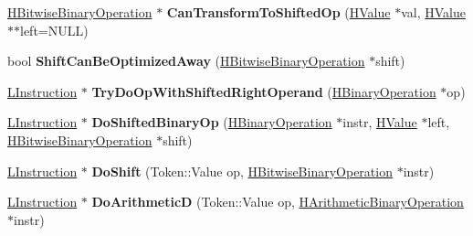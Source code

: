 \begin{DoxyCompactItemize}
\item 
\hyperlink{classv8_1_1internal_1_1_h_bitwise_binary_operation}{H\+Bitwise\+Binary\+Operation} $\ast$ {\bfseries Can\+Transform\+To\+Shifted\+Op} (\hyperlink{classv8_1_1internal_1_1_h_value}{H\+Value} $\ast$val, \hyperlink{classv8_1_1internal_1_1_h_value}{H\+Value} $\ast$$\ast$left=N\+U\+LL)\hypertarget{classv8_1_1internal_1_1_l_chunk_builder_a95d18fcf83e0971713140bd1d7b518e9}{}\label{classv8_1_1internal_1_1_l_chunk_builder_a95d18fcf83e0971713140bd1d7b518e9}

\item 
bool {\bfseries Shift\+Can\+Be\+Optimized\+Away} (\hyperlink{classv8_1_1internal_1_1_h_bitwise_binary_operation}{H\+Bitwise\+Binary\+Operation} $\ast$shift)\hypertarget{classv8_1_1internal_1_1_l_chunk_builder_a3e774b166b9f61e6011c37e14ff030d4}{}\label{classv8_1_1internal_1_1_l_chunk_builder_a3e774b166b9f61e6011c37e14ff030d4}

\item 
\hyperlink{classv8_1_1internal_1_1_l_instruction}{L\+Instruction} $\ast$ {\bfseries Try\+Do\+Op\+With\+Shifted\+Right\+Operand} (\hyperlink{classv8_1_1internal_1_1_h_binary_operation}{H\+Binary\+Operation} $\ast$op)\hypertarget{classv8_1_1internal_1_1_l_chunk_builder_a824fdde74860e7a8aa30f10ea9090d04}{}\label{classv8_1_1internal_1_1_l_chunk_builder_a824fdde74860e7a8aa30f10ea9090d04}

\item 
\hyperlink{classv8_1_1internal_1_1_l_instruction}{L\+Instruction} $\ast$ {\bfseries Do\+Shifted\+Binary\+Op} (\hyperlink{classv8_1_1internal_1_1_h_binary_operation}{H\+Binary\+Operation} $\ast$instr, \hyperlink{classv8_1_1internal_1_1_h_value}{H\+Value} $\ast$left, \hyperlink{classv8_1_1internal_1_1_h_bitwise_binary_operation}{H\+Bitwise\+Binary\+Operation} $\ast$shift)\hypertarget{classv8_1_1internal_1_1_l_chunk_builder_a98147229df0777b0e88359dbe1bd372b}{}\label{classv8_1_1internal_1_1_l_chunk_builder_a98147229df0777b0e88359dbe1bd372b}

\item 
\hyperlink{classv8_1_1internal_1_1_l_instruction}{L\+Instruction} $\ast$ {\bfseries Do\+Shift} (Token\+::\+Value op, \hyperlink{classv8_1_1internal_1_1_h_bitwise_binary_operation}{H\+Bitwise\+Binary\+Operation} $\ast$instr)\hypertarget{classv8_1_1internal_1_1_l_chunk_builder_a7fb98733b4fc4b83c5f63039c8bc249f}{}\label{classv8_1_1internal_1_1_l_chunk_builder_a7fb98733b4fc4b83c5f63039c8bc249f}

\item 
\hyperlink{classv8_1_1internal_1_1_l_instruction}{L\+Instruction} $\ast$ {\bfseries Do\+ArithmeticD} (Token\+::\+Value op, \hyperlink{classv8_1_1internal_1_1_h_arithmetic_binary_operation}{H\+Arithmetic\+Binary\+Operation} $\ast$instr)\hypertarget{classv8_1_1internal_1_1_l_chunk_builder_a9b447e818699e4928b4f769ae6b7ecbd}{}\label{classv8_1_1internal_1_1_l_chunk_builder_a9b447e818699e4928b4f769ae6b7ecbd}


\end{DoxyCompactItemize}
